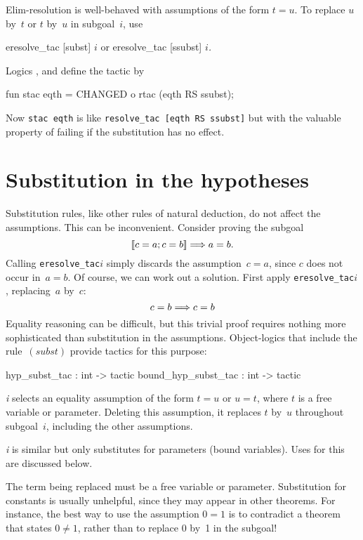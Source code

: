 Elim-resolution is well-behaved with assumptions of the form $t=u$.
To replace $u$ by~$t$ or $t$ by~$u$ in subgoal~$i$, use
\begin{ttbox} 
eresolve_tac [subst] \(i\)    {\rm or}    eresolve_tac [ssubst] \(i\){\it.}
\end{ttbox}

Logics \HOL, {\FOL} and {\ZF} define the tactic  by
\begin{ttbox} 
fun stac eqth = CHANGED o rtac (eqth RS ssubst);
\end{ttbox}
Now {\tt stac~eqth} is like {\tt resolve_tac [eqth RS ssubst]} but with the
valuable property of failing if the substitution has no effect.


\section{Substitution in the hypotheses}
Substitution rules, like other rules of natural deduction, do not affect
the assumptions.  This can be inconvenient.  Consider proving the subgoal
\[ \mathopen{[\![} c=a; c=b\mathclose{]\!]} \Longrightarrow a=b. \]
Calling {\tt eresolve_tac\ts[ssubst]\ts\(i\)} simply discards the
assumption~$c=a$, since $c$ does not occur in~$a=b$.  Of course, we can
work out a solution.  First apply {\tt eresolve_tac\ts[subst]\ts\(i\)},
replacing~$a$ by~$c$:
\[ c=b \Longrightarrow c=b \]
Equality reasoning can be difficult, but this trivial proof requires
nothing more sophisticated than substitution in the assumptions.
Object-logics that include the rule~$(subst)$ provide tactics for this
purpose:
\begin{ttbox} 
hyp_subst_tac       : int -> tactic
bound_hyp_subst_tac : int -> tactic
\end{ttbox}
\begin{ttdescription}
\item[\ttindexbold{hyp_subst_tac} {\it i}] 
  selects an equality assumption of the form $t=u$ or $u=t$, where $t$ is a
  free variable or parameter.  Deleting this assumption, it replaces $t$
  by~$u$ throughout subgoal~$i$, including the other assumptions.

\item[\ttindexbold{bound_hyp_subst_tac} {\it i}] 
  is similar but only substitutes for parameters (bound variables).
  Uses for this are discussed below.
\end{ttdescription}
The term being replaced must be a free variable or parameter.  Substitution
for constants is usually unhelpful, since they may appear in other
theorems.  For instance, the best way to use the assumption $0=1$ is to
contradict a theorem that states $0\not=1$, rather than to replace 0 by~1
in the subgoal!

